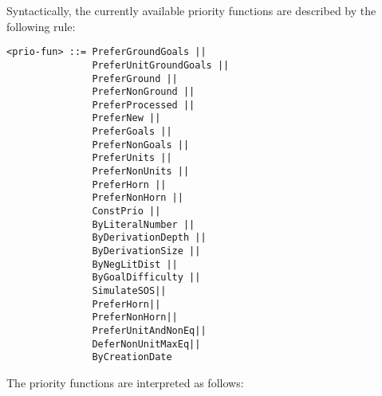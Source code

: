 \documentclass{article}
\begin{document}
Syntactically, the currently available priority functions are
described by the following rule:

\begin{verbatim}
<prio-fun> ::= PreferGroundGoals ||
               PreferUnitGroundGoals ||
               PreferGround ||
               PreferNonGround ||
               PreferProcessed ||
               PreferNew ||
               PreferGoals ||
               PreferNonGoals ||
               PreferUnits ||
               PreferNonUnits ||
               PreferHorn ||
               PreferNonHorn ||
               ConstPrio ||
               ByLiteralNumber ||
               ByDerivationDepth ||
               ByDerivationSize ||
               ByNegLitDist ||
               ByGoalDifficulty ||
               SimulateSOS||
               PreferHorn||
               PreferNonHorn||
               PreferUnitAndNonEq||
               DeferNonUnitMaxEq||
               ByCreationDate
\end{verbatim}

The priority functions are interpreted as follows:
\end{document}
